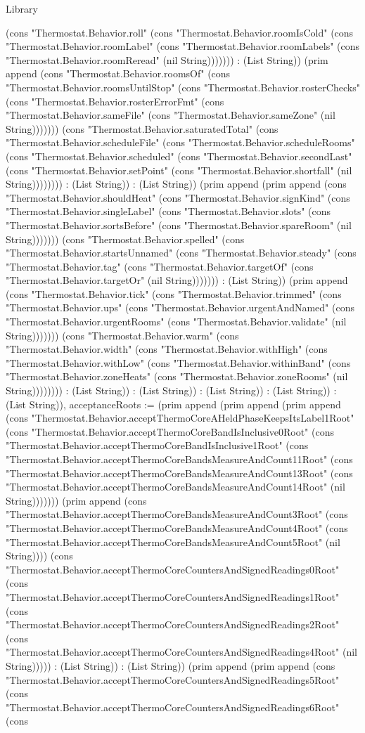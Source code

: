 \begin{lexlean}{Library}
\begin{semanticmodule}
{(cons "Thermostat.Behavior.roll" (cons "Thermostat.Behavior.roomIsCold" (cons "Thermostat.Behavior.roomLabel" (cons "Thermostat.Behavior.roomLabels" (cons "Thermostat.Behavior.roomReread" (nil String))))))) : (List String)) (prim append (cons "Thermostat.Behavior.roomsOf" (cons "Thermostat.Behavior.roomsUntilStop" (cons "Thermostat.Behavior.rosterChecks" (cons "Thermostat.Behavior.rosterErrorFmt" (cons "Thermostat.Behavior.sameFile" (cons "Thermostat.Behavior.sameZone" (nil String))))))) (cons "Thermostat.Behavior.saturatedTotal" (cons "Thermostat.Behavior.scheduleFile" (cons "Thermostat.Behavior.scheduleRooms" (cons "Thermostat.Behavior.scheduled" (cons "Thermostat.Behavior.secondLast" (cons "Thermostat.Behavior.setPoint" (cons "Thermostat.Behavior.shortfall" (nil String)))))))) : (List String)) : (List String)) (prim append (prim append (cons "Thermostat.Behavior.shouldHeat" (cons "Thermostat.Behavior.signKind" (cons "Thermostat.Behavior.singleLabel" (cons "Thermostat.Behavior.slots" (cons "Thermostat.Behavior.sortsBefore" (cons "Thermostat.Behavior.spareRoom" (nil String))))))) (cons "Thermostat.Behavior.spelled" (cons "Thermostat.Behavior.startsUnnamed" (cons "Thermostat.Behavior.steady" (cons "Thermostat.Behavior.tag" (cons "Thermostat.Behavior.targetOf" (cons "Thermostat.Behavior.targetOr" (nil String))))))) : (List String)) (prim append (cons "Thermostat.Behavior.tick" (cons "Thermostat.Behavior.trimmed" (cons "Thermostat.Behavior.ups" (cons "Thermostat.Behavior.urgentAndNamed" (cons "Thermostat.Behavior.urgentRooms" (cons "Thermostat.Behavior.validate" (nil String))))))) (cons "Thermostat.Behavior.warm" (cons "Thermostat.Behavior.width" (cons "Thermostat.Behavior.withHigh" (cons "Thermostat.Behavior.withLow" (cons "Thermostat.Behavior.withinBand" (cons "Thermostat.Behavior.zoneHeats" (cons "Thermostat.Behavior.zoneRooms" (nil String)))))))) : (List String)) : (List String)) : (List String)) : (List String)) : (List String)), acceptanceRoots := (prim append (prim append (prim append (cons "Thermostat.Behavior.acceptThermoCoreAHeldPhaseKeepsItsLabel1Root" (cons "Thermostat.Behavior.acceptThermoCoreBandIsInclusive0Root" (cons "Thermostat.Behavior.acceptThermoCoreBandIsInclusive1Root" (cons "Thermostat.Behavior.acceptThermoCoreBandsMeasureAndCount11Root" (cons "Thermostat.Behavior.acceptThermoCoreBandsMeasureAndCount13Root" (cons "Thermostat.Behavior.acceptThermoCoreBandsMeasureAndCount14Root" (nil String))))))) (prim append (cons "Thermostat.Behavior.acceptThermoCoreBandsMeasureAndCount3Root" (cons "Thermostat.Behavior.acceptThermoCoreBandsMeasureAndCount4Root" (cons "Thermostat.Behavior.acceptThermoCoreBandsMeasureAndCount5Root" (nil String)))) (cons "Thermostat.Behavior.acceptThermoCoreCountersAndSignedReadings0Root" (cons "Thermostat.Behavior.acceptThermoCoreCountersAndSignedReadings1Root" (cons "Thermostat.Behavior.acceptThermoCoreCountersAndSignedReadings2Root" (cons "Thermostat.Behavior.acceptThermoCoreCountersAndSignedReadings4Root" (nil String))))) : (List String)) : (List String)) (prim append (prim append (cons "Thermostat.Behavior.acceptThermoCoreCountersAndSignedReadings5Root" (cons "Thermostat.Behavior.acceptThermoCoreCountersAndSignedReadings6Root" (cons }
\end{semanticmodule}
\end{lexlean}
